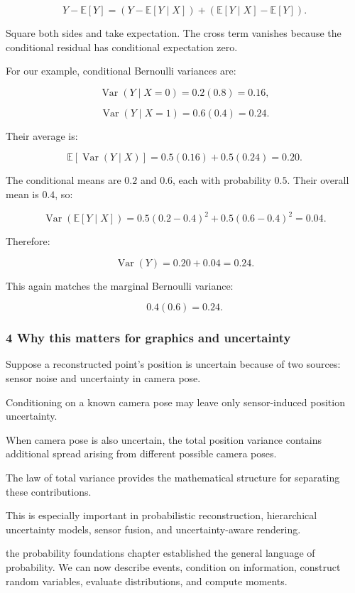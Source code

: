 \[
 Y-\mathbb E[Y] = (Y-\mathbb E[Y\mid X]) + (\mathbb E[Y\mid X]-\mathbb E[Y]).
\]

Square both sides and take expectation. The cross term vanishes because the conditional residual has conditional expectation zero.

For our example, conditional Bernoulli variances are:

\[
 \operatorname{Var}(Y\mid X=0)=0.2(0.8)=0.16,
\]

\[
 \operatorname{Var}(Y\mid X=1)=0.6(0.4)=0.24.
\]

Their average is:

\[
 \mathbb E[\operatorname{Var}(Y\mid X)] = 0.5(0.16)+0.5(0.24) =\boxed{0.20}.
\]

The conditional means are \(0.2\) and \(0.6\), each with probability \(0.5\). Their overall mean is \(0.4\), so:

\[
 \operatorname{Var}(\mathbb E[Y\mid X]) = 0.5(0.2-0.4)^2+ 0.5(0.6-0.4)^2 =\boxed{0.04}.
\]

Therefore:

\[
 \operatorname{Var}(Y)=0.20+0.04=\boxed{0.24}.
\]

This again matches the marginal Bernoulli variance:

\[
 0.4(0.6)=0.24.
\]

\subsubsection{4 Why this matters for graphics and uncertainty}\label{02-foundations-ii-ch023-why-this-matters-for-graphics-and-uncertainty}

Suppose a reconstructed point's position is uncertain because of two sources: sensor noise and uncertainty in camera pose.

Conditioning on a known camera pose may leave only sensor-induced position uncertainty.

When camera pose is also uncertain, the total position variance contains additional spread arising from different possible camera poses.

The law of total variance provides the mathematical structure for separating these contributions.

This is especially important in probabilistic reconstruction, hierarchical uncertainty models, sensor fusion, and uncertainty-aware rendering.

the probability foundations chapter established the general language of probability. We can now describe events, condition on information, construct random variables, evaluate distributions, and compute moments.

